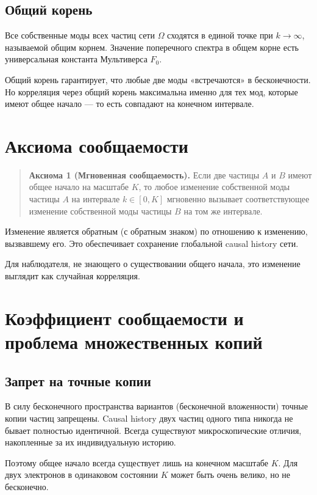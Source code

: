 \documentclass[12pt,a4paper]{article}
\begin{document}
\subsection{Общий корень}
Все собственные моды всех частиц сети $\Omega$ сходятся в единой точке при $k \to \infty$, называемой общим корнем. Значение поперечного спектра в общем корне есть универсальная константа Мультиверса $F_0$.

Общий корень гарантирует, что любые две моды «встречаются» в бесконечности. Но корреляция через общий корень максимальна именно для тех мод, которые имеют общее начало --- то есть совпадают на конечном интервале.

\section{Аксиома сообщаемости}

\begin{quote}
\textbf{Аксиома 1 (Мгновенная сообщаемость).} Если две частицы $A$ и $B$ имеют общее начало на масштабе $K$, то любое изменение собственной моды частицы $A$ на интервале $k \in [0, K]$ мгновенно вызывает соответствующее изменение собственной моды частицы $B$ на том же интервале.
\end{quote}

Изменение является обратным (с обратным знаком) по отношению к изменению, вызвавшему его. Это обеспечивает сохранение глобальной causal history сети.

Для наблюдателя, не знающего о существовании общего начала, это изменение выглядит как случайная корреляция.

\section{Коэффициент сообщаемости и проблема множественных копий}

\subsection{Запрет на точные копии}
В силу бесконечного пространства вариантов (бесконечной вложенности) точные копии частиц запрещены. Causal history двух частиц одного типа никогда не бывает полностью идентичной. Всегда существуют микроскопические отличия, накопленные за их индивидуальную историю.

Поэтому общее начало всегда существует лишь на конечном масштабе $K$. Для двух электронов в одинаковом состоянии $K$ может быть очень велико, но не бесконечно.
\end{document}
